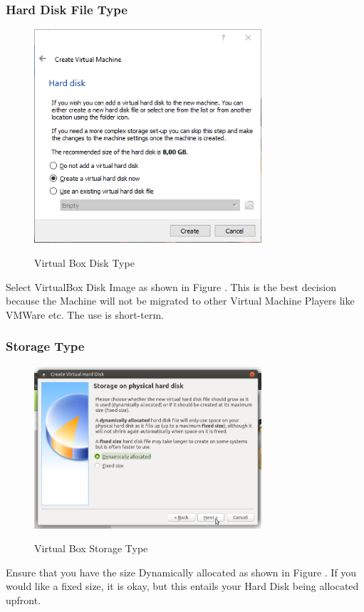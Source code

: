 \subsubsection{Hard Disk File Type}
\begin{figure}[!htb]
    \centering
    \includegraphics[width=0.752\textwidth]{images/Win00-03.png}\\[0cm]  
    \caption[Windows Virtual Box]{Virtual Box Disk Type}
    \label{fig:00-04 - Windows Virtual Box Disk Type} 
\end{figure}
Select VirtualBox Disk Image as shown in Figure .
This is the best decision because the Machine will not be migrated to other
Virtual Machine Players like VMWare etc. The use is short-term.

\subsubsection{Storage Type}
\begin{figure}[!htb]
    \centering
    \includegraphics[width=0.752\textwidth]{images/00-04.png}\\[0cm]  
    \caption[Windows Virtual Box]{Virtual Box Storage Type}
    \label{fig:00-05 - Windows Virtual Box Storage Type} 
\end{figure}
Ensure that you have the size Dynamically allocated as shown in Figure .
If you would like a fixed size, it is okay, but this entails your Hard Disk
being allocated upfront.

